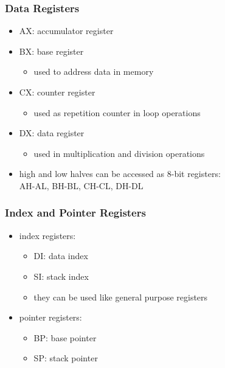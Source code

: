 \documentclass[dvipsnames]{beamer}
\begin{document}
\begin{frame}
  \frametitle{Data Registers}

  \begin{itemize}
    \item AX: accumulator register

    \item BX: base register
    \begin{itemize}
      \item used to address data in memory
    \end{itemize}

    \item CX: counter register
    \begin{itemize}
      \item used as repetition counter in loop operations
    \end{itemize}

    \item DX: data register
    \begin{itemize}
      \item used in multiplication and division operations
    \end{itemize}

    \medskip
    \item high and low halves can be accessed as 8-bit registers:\\
      AH-AL, BH-BL, CH-CL, DH-DL
  \end{itemize}
\end{frame}

\begin{frame}
  \frametitle{Index and Pointer Registers}

  \begin{itemize}
    \item index registers:
    \begin{itemize}
      \item DI: data index
      \item SI: stack index
      \item they can be used like general purpose registers
    \end{itemize}

    \medskip
    \item pointer registers:
    \begin{itemize}
      \item BP: base pointer
      \item SP: stack pointer
    \end{itemize}
  \end{itemize}
\end{frame}
\end{document}
